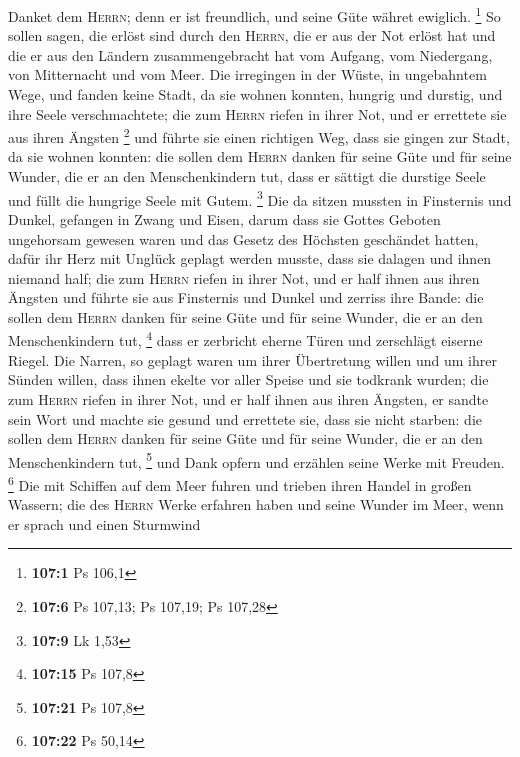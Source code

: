  Danket dem \textsc{Herrn}; denn er ist freundlich, und
seine Güte währet ewiglich. \footnote{\textbf{107:1} Ps 106,1}
 So sollen sagen, die erlöst sind durch den
\textsc{Herrn}, die er aus der Not erlöst hat  und die er
aus den Ländern zusammengebracht hat vom Aufgang, vom Niedergang, von
Mitternacht und vom Meer.  Die irregingen in der Wüste, in
ungebahntem Wege, und fanden keine Stadt, da sie wohnen konnten,
 hungrig und durstig, und ihre Seele verschmachtete;
 die zum \textsc{Herrn} riefen in ihrer Not, und er
errettete sie aus ihren Ängsten \footnote{\textbf{107:6} Ps 107,13; Ps
  107,19; Ps 107,28}  und führte sie einen richtigen Weg,
dass sie gingen zur Stadt, da sie wohnen konnten:  die
sollen dem \textsc{Herrn} danken für seine Güte und für seine Wunder,
die er an den Menschenkindern tut,  dass er sättigt die
durstige Seele und füllt die hungrige Seele mit Gutem. \footnote{\textbf{107:9}
  Lk 1,53}  Die da sitzen mussten in Finsternis und
Dunkel, gefangen in Zwang und Eisen,  darum dass sie
Gottes Geboten ungehorsam gewesen waren und das Gesetz des Höchsten
geschändet hatten,  dafür ihr Herz mit Unglück geplagt
werden musste, dass sie dalagen und ihnen niemand half; 
die zum \textsc{Herrn} riefen in ihrer Not, und er half ihnen aus ihren
Ängsten  und führte sie aus Finsternis und Dunkel und
zerriss ihre Bande:  die sollen dem \textsc{Herrn} danken
für seine Güte und für seine Wunder, die er an den Menschenkindern tut,
\footnote{\textbf{107:15} Ps 107,8}  dass er zerbricht
eherne Türen und zerschlägt eiserne Riegel.  Die Narren,
so geplagt waren um ihrer Übertretung willen und um ihrer Sünden willen,
 dass ihnen ekelte vor aller Speise und sie todkrank
wurden;  die zum \textsc{Herrn} riefen in ihrer Not, und
er half ihnen aus ihren Ängsten,  er sandte sein Wort und
machte sie gesund und errettete sie, dass sie nicht starben:
 die sollen dem \textsc{Herrn} danken für seine Güte und
für seine Wunder, die er an den Menschenkindern tut, \footnote{\textbf{107:21}
  Ps 107,8}  und Dank opfern und erzählen seine Werke mit
Freuden. \footnote{\textbf{107:22} Ps 50,14}  Die mit
Schiffen auf dem Meer fuhren und trieben ihren Handel in großen Wassern;
 die des \textsc{Herrn} Werke erfahren haben und seine
Wunder im Meer,  wenn er sprach und einen Sturmwind
